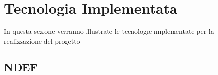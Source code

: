 \section{Tecnologia Implementata}
In questa sezione verranno illustrate le tecnologie implementate per la realizzazione del progetto
\subsection{NDEF}
